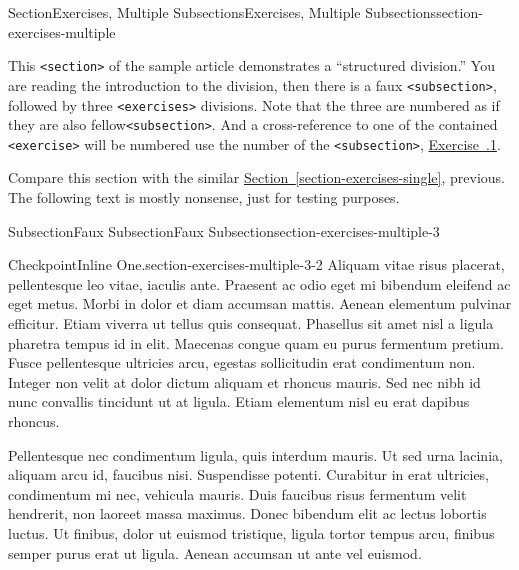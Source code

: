 \documentclass[twoside,10pt,]{article}
\newcommand{\xreffont}{\relax}
\newcommand{\mono}[1]{\texttt{#1}}
\numberwithin{equation}{section}
\begin{document}
%
%
\typeout{************************************************}
\typeout{************************************************}
%
\begin{sectionptx}{Section}{Exercises, Multiple Subsections}{}{Exercises, Multiple Subsections}{}{}{section-exercises-multiple}
\begin{introduction}{}%
This \mono{<section>} of the sample article demonstrates a ``structured division.''  You are reading the introduction to the division, then there is a faux \mono{<subsection>}, followed by three \mono{<exercises>} divisions.  Note that the three are numbered as if they are also fellow\mono{<subsection>}.  And a cross-reference to one of the contained \mono{<exercise>} will be numbered use the number of the \mono{<subsection>}, \hyperlink{exercise-challenging-one-structured}{Exercise~{\xreffont 39.3.1}}.%
\par
Compare this section with the similar \hyperref[section-exercises-single]{Section~{\xreffont\ref{section-exercises-single}}}, previous.  The following text is mostly nonsense, just for testing purposes.%
\end{introduction}%
%
%
\typeout{************************************************}
\typeout{************************************************}
%
\begin{subsectionptx}{Subsection}{Faux Subsection}{}{Faux Subsection}{}{}{section-exercises-multiple-3}
\begin{inlineexercise}{Checkpoint}{Inline One.}{section-exercises-multiple-3-2}%
Aliquam vitae risus placerat, pellentesque leo vitae, iaculis ante. Praesent ac odio eget mi bibendum eleifend ac eget metus. Morbi in dolor et diam accumsan mattis. Aenean elementum pulvinar efficitur. Etiam viverra ut tellus quis consequat. Phasellus sit amet nisl a ligula pharetra tempus id in elit. Maecenas congue quam eu purus fermentum pretium. Fusce pellentesque ultricies arcu, egestas sollicitudin erat condimentum non. Integer non velit at dolor dictum aliquam et rhoncus mauris. Sed nec nibh id nunc convallis tincidunt ut at ligula. Etiam elementum nisl eu erat dapibus rhoncus.%
\end{inlineexercise}%
Pellentesque nec condimentum ligula, quis interdum mauris. Ut sed urna lacinia, aliquam arcu id, faucibus nisi. Suspendisse potenti. Curabitur in erat ultricies, condimentum mi nec, vehicula mauris. Duis faucibus risus fermentum velit hendrerit, non laoreet massa maximus. Donec bibendum elit ac lectus lobortis luctus. Ut finibus, dolor ut euismod tristique, ligula tortor tempus arcu, finibus semper purus erat ut ligula. Aenean accumsan ut ante vel euismod.%

\end{subsectionptx}
\end{sectionptx}
\end{document}
